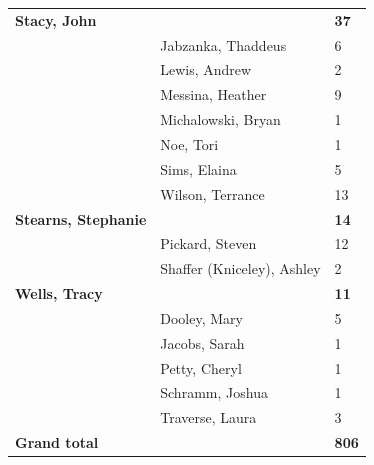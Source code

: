 \documentclass{article}\usepackage[]{graphicx}\usepackage[]{color}
\begin{document}
{\begin{longtable} { >{\raggedright}p{}|p{}p{}}
  \textbf{Stacy, John} &  & \hspace{2cm}\textbf{37} \\ 
   & Jabzanka, Thaddeus & 6 \\ 
   & Lewis, Andrew & 2 \\ 
   \rowcolor[gray]{0.90} & Messina, Heather & 9 \\ 
   \rowcolor[gray]{0.90} & Michalowski, Bryan & 1 \\ 
   \rowcolor[gray]{0.90} & Noe, Tori & 1 \\ 
   & Sims, Elaina & 5 \\ 
   & Wilson, Terrance & 13 \\ 
  \textbf{Stearns, Stephanie} &  & \hspace{2cm}\textbf{14} \\ 
   \rowcolor[gray]{0.90} & Pickard, Steven & 12 \\ 
   \rowcolor[gray]{0.90} & Shaffer (Kniceley), Ashley & 2 \\ 
   \rowcolor[gray]{0.90}\textbf{Wells, Tracy} &  & \hspace{2cm}\textbf{11} \\ 
   & Dooley, Mary & 5 \\ 
   & Jacobs, Sarah & 1 \\ 
   & Petty, Cheryl & 1 \\ 
   \rowcolor[gray]{0.90} & Schramm, Joshua & 1 \\ 
   \rowcolor[gray]{0.90} & Traverse, Laura & 3 \\ 
   \rowcolor[gray]{0.90}\textbf{Grand total} &  & \textbf{806} \\ 
   \end{longtable}

}

\pagebreak
\end{document}
